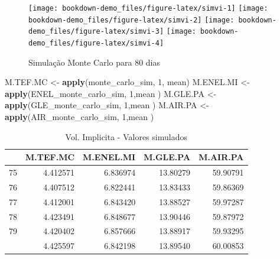 \documentclass[
  12pt,
  a4paper,
  openany]{book}
\newenvironment{Shaded}{\begin{snugshade}}{\end{snugshade}}
\newcommand{\DecValTok}[1]{\textcolor[rgb]{0.00,0.00,0.81}{#1}}
\newcommand{\KeywordTok}[1]{\textcolor[rgb]{0.13,0.29,0.53}{\textbf{#1}}}
\newcommand{\NormalTok}[1]{#1}
\newcommand{\StringTok}[1]{\textcolor[rgb]{0.31,0.60,0.02}{#1}}
\begin{document}
\scriptsize

\normalsize

\scriptsize

\normalsize

\begin{figure}

{\centering \texttt{[image: bookdown-demo\_files/figure-latex/simvi-1]} \texttt{[image: bookdown-demo\_files/figure-latex/simvi-2]} \texttt{[image: bookdown-demo\_files/figure-latex/simvi-3]} \texttt{[image: bookdown-demo\_files/figure-latex/simvi-4]} 

}

\caption{Simulação Monte Carlo para 80 dias}\label{fig:simvi}
\end{figure}

\scriptsize

\begin{Shaded}
\begin{Highlighting}[]
\NormalTok{M.TEF.MC \textless{}{-}}\StringTok{ }\KeywordTok{apply}\NormalTok{(monte\_carlo\_sim, }\DecValTok{1}\NormalTok{, mean)}
\NormalTok{M.ENEL.MI \textless{}{-}}\StringTok{ }\KeywordTok{apply}\NormalTok{(ENEL\_monte\_carlo\_sim, }\DecValTok{1}\NormalTok{,mean )}
\NormalTok{M.GLE.PA \textless{}{-}}\StringTok{ }\KeywordTok{apply}\NormalTok{(GLE\_monte\_carlo\_sim, }\DecValTok{1}\NormalTok{,mean )}
\NormalTok{M.AIR.PA \textless{}{-}}\StringTok{ }\KeywordTok{apply}\NormalTok{(AIR\_monte\_carlo\_sim, }\DecValTok{1}\NormalTok{,mean )}
\end{Highlighting}
\end{Shaded}

\normalsize
\begin{table}[!h]

\caption{\label{tab:unnamed-chunk-53}Vol. Implicita - Valores simulados}
\centering
\begin{tabular}[t]{lrrrr}
\toprule
  & M.TEF.MC & M.ENEL.MI & M.GLE.PA & M.AIR.PA\\
\midrule
75 & 4.412571 & 6.836974 & 13.80279 & 59.90791\\
76 & 4.407512 & 6.822441 & 13.83433 & 59.86369\\
77 & 4.412001 & 6.843420 & 13.88527 & 59.97287\\
78 & 4.423491 & 6.848677 & 13.90446 & 59.87972\\
79 & 4.420402 & 6.857666 & 13.88917 & 59.93295\\
\addlinespace
80 & 4.425597 & 6.842198 & 13.89540 & 60.00853\\
\bottomrule
\end{tabular}
\end{table}
\FloatBarrier
\centering
\end{document}
